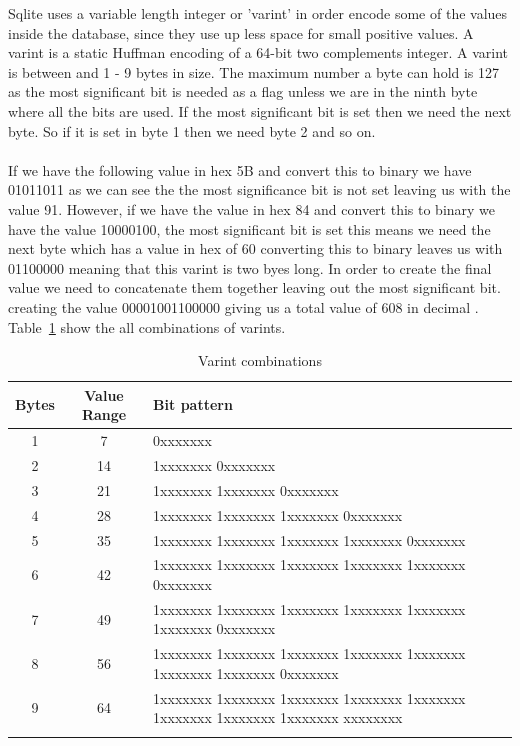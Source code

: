 Sqlite uses a variable length integer or 'varint' in order encode some of the values inside the database, since they use up less space for small positive values. A varint is a static Huffman encoding of a 64-bit two complements integer. A varint is between and 1 - 9 bytes in size. The maximum number a byte can hold is 127 as the most significant bit is needed as a flag unless we are in the ninth byte where all the bits are used. If the most significant bit is set then we need the next byte. So if it is set in byte 1 then we need byte 2 and so on.
\\\\
If we have the following value in hex 5B and convert this to binary we have 01011011 as we can see the the most significance bit is not set leaving us with the value 91. However, if we have the value in hex 84 and convert this to binary we have the value 10000100, the most significant bit is set this means we need the next byte which has a value in hex of 60 converting this to binary leaves us with  01100000 meaning that this varint is two byes long. In order to create the final value we need to concatenate them together leaving out the most significant bit. creating the value 00001001100000 giving us a total value of 608 in decimal \citep{sausagefactory}. Table~\ref{tbl:varints} show the all combinations of varints. 

\begin{longtable}[h]{| c | c | p{10cm} |}
		\hline
			\textbf{Bytes} & \textbf{Value Range} & \textbf{Bit pattern} \\ 
		\hline
		\endhead
			1 & 7 &  0xxxxxxx \\ \hline
			2 & 14 & 1xxxxxxx 0xxxxxxx\\ \hline
			3 & 21 & 1xxxxxxx 1xxxxxxx 0xxxxxxx\\ \hline
			4 & 28 & 1xxxxxxx 1xxxxxxx 1xxxxxxx 0xxxxxxx\\ \hline
			5 & 35 & 1xxxxxxx 1xxxxxxx 1xxxxxxx 1xxxxxxx 0xxxxxxx\\ \hline
			6 & 42 & 1xxxxxxx 1xxxxxxx 1xxxxxxx 1xxxxxxx 1xxxxxxx 0xxxxxxx\\ \hline
			7 & 49 & 1xxxxxxx 1xxxxxxx 1xxxxxxx 1xxxxxxx 1xxxxxxx 1xxxxxxx 0xxxxxxx\\ \hline
			8 & 56 & 1xxxxxxx 1xxxxxxx 1xxxxxxx 1xxxxxxx 1xxxxxxx 1xxxxxxx 1xxxxxxx 0xxxxxxx\\ \hline
			9 & 64 & 1xxxxxxx 1xxxxxxx 1xxxxxxx 1xxxxxxx 1xxxxxxx 1xxxxxxx 1xxxxxxx 1xxxxxxx xxxxxxxx\\
		\hline
	\caption{Varint combinations \cite{sqliteray}}
	\label{tbl:varints}
\end{longtable}

